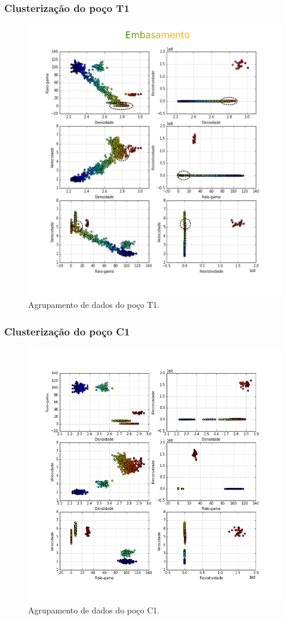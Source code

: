 \documentclass[10pt]{beamer} %
\begin{document}
\begin{frame}
	\frametitle{Clusterização do poço T1}
	\begin{figure}[H]
		\centering
		\includegraphics[scale=0.4]{Imagens/embasamento.png}
		\caption{Agrupamento de dados do poço T1.}
		\label{clusterT1}
	\end{figure} 
\end{frame}

\begin{frame}
	\frametitle{Clusterização do poço C1}
	\begin{figure}[H]
		\centering
			\includegraphics[scale=0.3]{Imagens/cluterpocoC1.png}
		\caption{Agrupamento de dados do poço C1.}
		\label{clusterC1}
	\end{figure} 
\end{frame}
\end{document}
